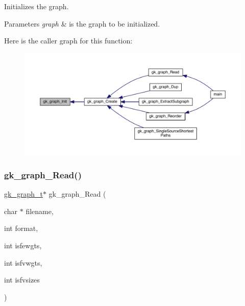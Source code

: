 Initializes the graph. 
\begin{DoxyParams}{Parameters}
{\em graph} & is the graph to be initialized. \\
\hline
\end{DoxyParams}
Here is the caller graph for this function\+:\nopagebreak
\begin{figure}[H]
\begin{center}
\leavevmode
\includegraphics[width=350pt]{a00846_ab017e0e6f2436f3ad24ea01d8b2c588c_icgraph}
\end{center}
\end{figure}
\mbox{\label{a00846_a432baae7f5c91c3604b42efb324b4131}} 
\subsubsection{\texorpdfstring{gk\+\_\+graph\+\_\+\+Read()}{gk\_graph\_Read()}}
{\footnotesize\ttfamily \hyperlink{a00638}{gk\+\_\+graph\+\_\+t}$\ast$ gk\+\_\+graph\+\_\+\+Read (\begin{DoxyParamCaption}\item[{char $\ast$}]{filename,  }\item[{int}]{format,  }\item[{int}]{isfewgts,  }\item[{int}]{isfvwgts,  }\item[{int}]{isfvsizes }\end{DoxyParamCaption})}

